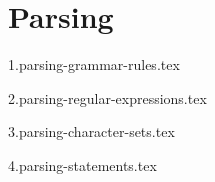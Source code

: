 
\section{Parsing}
{
	\lipsum[1]
	
	{1.parsing-grammar-rules.tex}
	
	{2.parsing-regular-expressions.tex}
	
	{3.parsing-character-sets.tex}
	
	{4.parsing-statements.tex}
}

